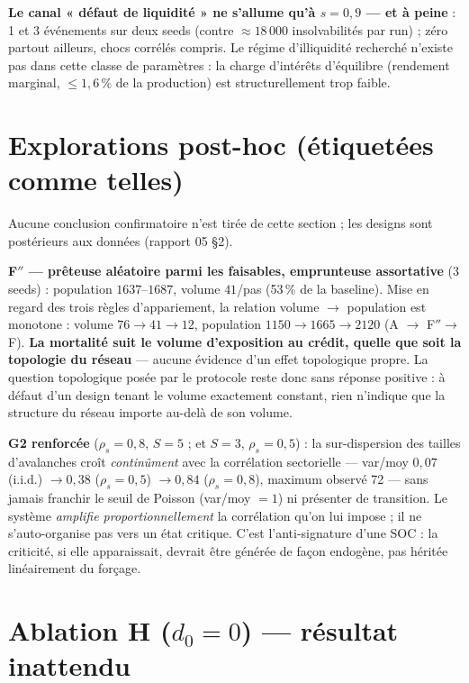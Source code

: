 \documentclass[11pt,a4paper]{article}
\begin{document}
\textbf{Le canal « défaut de liquidité » ne s'allume qu'à $s = 0{,}9$ — et
à peine} : 1 et 3 événements sur deux seeds (contre $\approx 18\,000$
insolvabilités par run) ; zéro partout ailleurs, chocs corrélés compris.
Le régime d'illiquidité recherché n'existe pas dans cette classe de
paramètres : la charge d'intérêts d'équilibre (rendement marginal,
$\le 1{,}6\,\%$ de la production) est structurellement trop faible.

\section{Explorations post-hoc (étiquetées comme telles)}
\label{sec:explo}

Aucune conclusion confirmatoire n'est tirée de cette section ; les designs
sont postérieurs aux données (rapport 05 §2).

\textbf{F$''$ — prêteuse aléatoire parmi les faisables, emprunteuse
assortative} (3 seeds) : population $1637$--$1687$, volume $41$/pas
(53\,\% de la baseline). Mise en regard des trois règles d'appariement, la
relation volume $\to$ population est monotone : volume $76 \to 41 \to 12$,
population $1150 \to 1665 \to 2120$ (A $\to$ F$'' \to$ F). \textbf{La
mortalité suit le volume d'exposition au crédit, quelle que soit la
topologie du réseau} — aucune évidence d'un effet topologique propre.
La question topologique posée par le protocole reste donc sans réponse
positive : à défaut d'un design tenant le volume exactement constant, rien
n'indique que la structure du réseau importe au-delà de son volume.

\textbf{G2 renforcée} ($\rho_s = 0{,}8$, $S{=}5$ ; et $S{=}3$,
$\rho_s = 0{,}5$) : la sur-dispersion des tailles d'avalanches croît
\emph{continûment} avec la corrélation sectorielle — var/moy
$0{,}07$ (i.i.d.) $\to 0{,}38$ ($\rho_s = 0{,}5$) $\to 0{,}84$
($\rho_s = 0{,}8$), maximum observé 72 — sans jamais franchir le seuil de
Poisson (var/moy $= 1$) ni présenter de transition. Le système
\emph{amplifie proportionnellement} la corrélation qu'on lui impose ; il ne
s'auto-organise pas vers un état critique. C'est l'anti-signature d'une
SOC : la criticité, si elle apparaissait, devrait être générée de façon
endogène, pas héritée linéairement du forçage.

\section{Ablation H ($d_0 = 0$) — résultat inattendu}
\end{document}
